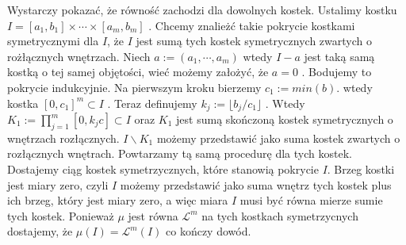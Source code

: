 Wystarczy pokazać, że równość zachodzi dla dowolnych kostek. Ustalimy kostku $I = [a_1, b_1] \times \cdots \times [a_m, b_m]$  . Chcemy znalieżć takie pokrycie kostkami symetrycznymi dla $I$, że $I$ jest sumą tych kostek symetrycznych zwartych o rożłącznych wnętrzach. Niech $a := (a_1, \cdots, a_m)$ wtedy $I-a$ jest taką samą kostką o tej samej objętości, wieć możemy założyć, że $a = 0$ . Bodujemy to pokrycie indukcyjnie. Na pierwszym kroku bierzemy $c_1 := min(b)$. wtedy kostka $[0, c_1]^m \subset I$ .
Teraz definujemy $k_j := \lfloor b_j/c_1 \rfloor$ . Wtedy $K_1 := \prod_{j = 1}^m [0, k_jc] \subset I$   oraz $K_1$ jest sumą skończoną kostek symetrycznych o wnętrzach rozłącznych. $I \backslash K_1$ możemy przedstawić jako suma kostek zwartych o rozłącznych wnętrach. Powtarzamy tą samą procedurę dla tych kostek. Dostajemy ciąg kostek symetrzycznych, które stanowią pokrycie $I$. Brzeg kostki jest miary zero, czyli $I$ możemy przedstawić jako suma wnętrz tych  kostek plus ich brzeg, który jest miary zero, a więc miara $I$ musi być równa mierze sumie tych kostek. Ponieważ $\mu$ jest równa $\mathcal{L}^m$ na tych kostkach symetrzycnych dostajemy, że $\mu(I) = \mathcal{L}^m(I)$ co kończy dowód. 